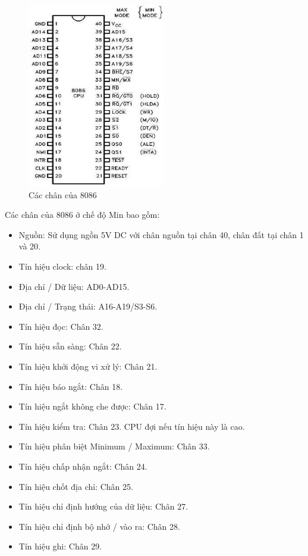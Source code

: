 \documentclass[../report.tex]{subfiles}
\begin{document}
\begin{figure}[H]
    \centering
    \includegraphics[width=6cm]{figures/8086-pins.jpg}
    \caption{Các chân của 8086}
\end{figure}

Các chân của 8086 ở chế độ Min bao gồm: 
\begin{itemize}
    \item Nguồn: Sử dụng ngồn 5V DC với chân nguồn tại chân 40, chân đất tại chân 1 và 20. 
    \item Tín hiệu clock: chân 19. 
    \item Địa chỉ / Dữ liệu: AD0-AD15. 
    \item Địa chỉ / Trạng thái: A16-A19/S3-S6.
    \item Tín hiệu đọc: Chân 32. 
    \item Tín hiệu sẵn sàng: Chân 22. 
    \item Tín hiệu khởi động vi xử lý: Chân 21.
    \item Tín hiệu báo ngắt: Chân 18. 
    \item Tín hiệu ngắt không che được: Chân 17. 
    \item Tín hiệu kiểm tra: Chân 23. CPU đợi nếu tín hiệu này là cao. 
    \item Tín hiệu phân biệt Minimum / Maximum: Chân 33. 
    \item Tín hiệu chấp nhận ngắt: Chân 24. 
    \item Tín hiệu chốt địa chỉ: Chân 25. 
    \item Tín hiệu chỉ định hướng của dữ liệu: Chân 27. 
    \item Tín hiệu chỉ định bộ nhớ / vào ra: Chân 28. 
    \item Tín hiệu ghi: Chân 29. 

\end{itemize}
\end{document}
